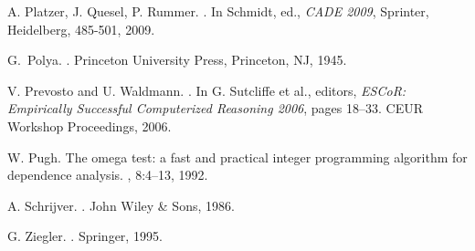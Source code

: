 \documentclass[runningheds]{llncs}
\begin{document}
\begin{thebibliography}{10}
A. Platzer, J. Quesel, P. Rummer.
.
\newblock In Schmidt, ed., {\em CADE 2009}, Sprinter, Heidelberg, 485-501, 2009.

G.~Polya.
.
\newblock Princeton University Press, Princeton, NJ,
  1945.

V. Prevosto and U. Waldmann.
.
\newblock In G. Sutcliffe et al., editors, {\em
  {ESCoR: Empirically Successful Computerized Reasoning 2006}}, 
  pages 18--33. CEUR Workshop Proceedings, 2006.
  
W. Pugh.
\newblock The omega test: a fast and practical integer programming algorithm
  for dependence analysis.
, 8:4--13, 1992.

A. Schrijver.
.
\newblock John Wiley \& Sons, 1986.



G. Ziegler.
.
\newblock Springer, 1995.

\end{thebibliography}
\end{document}
